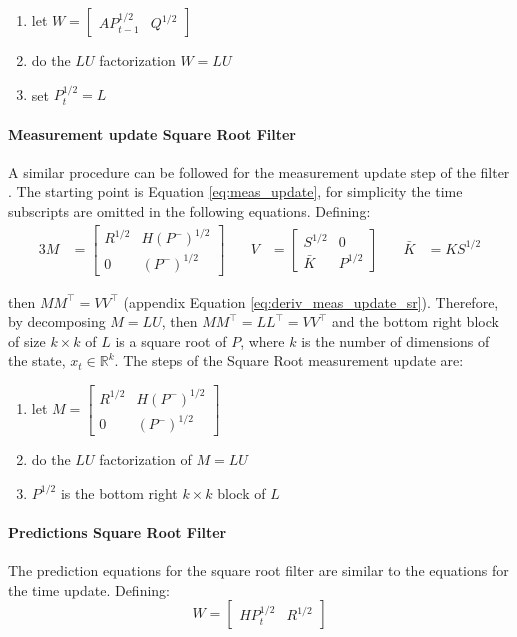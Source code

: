 \documentclass{article}
\begin{document}
\begin{enumerate}
    \item let  $W = \begin{bmatrix}AP_{t-1}^{1/2} & Q^{1/2}\end{bmatrix}$
    \item do the $LU$ factorization $W=LU$
    \item set $P_t^{1/2} = L$
\end{enumerate}

\paragraph{Measurement update Square Root Filter} A similar procedure can be followed for the measurement update step of the filter \cite{dan_simon_optimal_2006}. The starting point is Equation \ref{eq:meas_update}, for simplicity the time subscripts are omitted in the following equations. Defining:
\begin{alignat*}{3}
    M &= \begin{bmatrix} R^{1/2} & H(P^-)^{1/2} \\ 0 & (P^-)^{1/2} \end{bmatrix} \quad &
    V &= \begin{bmatrix} S^{1/2} & 0 \\ \bar{K} & P^{1/2} \end{bmatrix} \quad&
    \bar{K} &= KS^{1/2}
\end{alignat*}

then $MM^\top = VV^\top$ (appendix Equation \ref{eq:deriv_meas_update_sr}). Therefore, by decomposing $M=LU$, then $MM^\top=LL^\top=VV^\top$ and the bottom right block of size $k \times k$ of $L$ is a square root of $P$, where $k$ is the number of dimensions of the state, $x_t \in \mathbb{R}^k$.
The steps of the Square Root measurement update are:
\begin{enumerate}
 \item let $M = \begin{bmatrix} R^{1/2} & H(P^-)^{1/2} \\ 0 & (P^-)^{1/2} \end{bmatrix}$
 \item do the $LU$ factorization of $M=LU$
 \item $P^{1/2}$ is the bottom right $k \times k$ block of $L$
\end{enumerate}

\paragraph{Predictions Square Root Filter} The prediction equations for the square root filter are similar to the equations for the time update. Defining:
\begin{equation*}
    W = \begin{bmatrix}HP_{t}^{1/2} & R^{1/2}\end{bmatrix}
\end{equation*}
\end{document}
